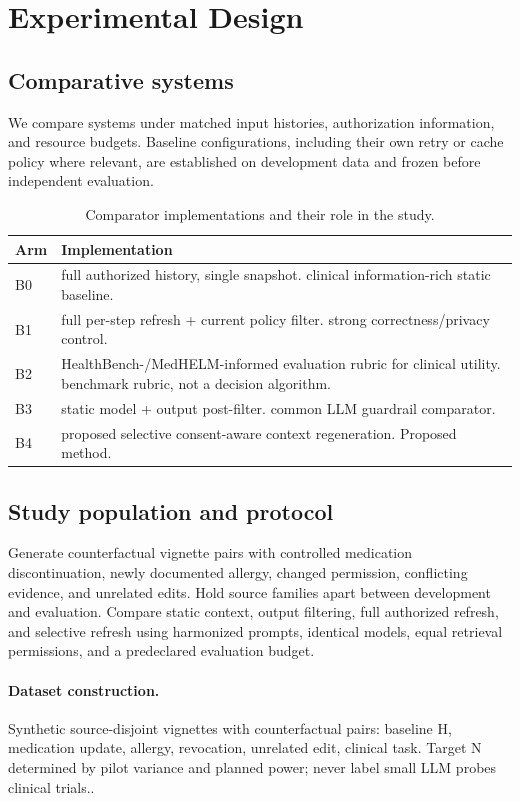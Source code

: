 \documentclass[11pt,a4paper]{article}
\begin{document}
\section{Experimental Design}
\subsection{Comparative systems}
We compare systems under matched input histories, authorization information, and resource budgets. Baseline configurations, including their own retry or cache policy where relevant, are established on development data and frozen before independent evaluation.
\begin{table}[ht]
\centering\footnotesize
\caption{Comparator implementations and their role in the study.}
\begin{tabularx}{\linewidth}{@{}lX@{}}\toprule
Arm & Implementation \\ \midrule
B0 & full authorized history, single snapshot. clinical information-rich static baseline. \\ 
B1 & full per-step refresh + current policy filter. strong correctness/privacy control. \\ 
B2 & HealthBench-/MedHELM-informed evaluation rubric for clinical utility. benchmark rubric, not a decision algorithm. \\ 
B3 & static model + output post-filter. common LLM guardrail comparator. \\ 
B4 & proposed selective consent-aware context regeneration. Proposed method. \\ 
\bottomrule\end{tabularx}
\end{table}

\subsection{Study population and protocol}
Generate counterfactual vignette pairs with controlled medication discontinuation, newly documented allergy, changed permission, conflicting evidence, and unrelated edits. Hold source families apart between development and evaluation. Compare static context, output filtering, full authorized refresh, and selective refresh using harmonized prompts, identical models, equal retrieval permissions, and a predeclared evaluation budget.

\paragraph{Dataset construction.} Synthetic source-disjoint vignettes with counterfactual pairs: baseline H, medication update, allergy, revocation, unrelated edit, clinical task. Target N determined by pilot variance and planned power; never label small LLM probes clinical trials..
\end{document}
